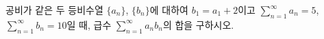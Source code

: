 공비가 같은 두 등비수열 $\{a_n\}$, $\{b_n\}$에 대하여 $b_1=a_1+2$이고 $\displaystyle\sum_{n=1}^{\infty} a_n=5$, $\displaystyle\sum_{n=1}^{\infty} b_n=10$일 때, 급수 $\displaystyle\sum_{n=1}^{\infty} a_nb_n$의 합을 구하시오.
